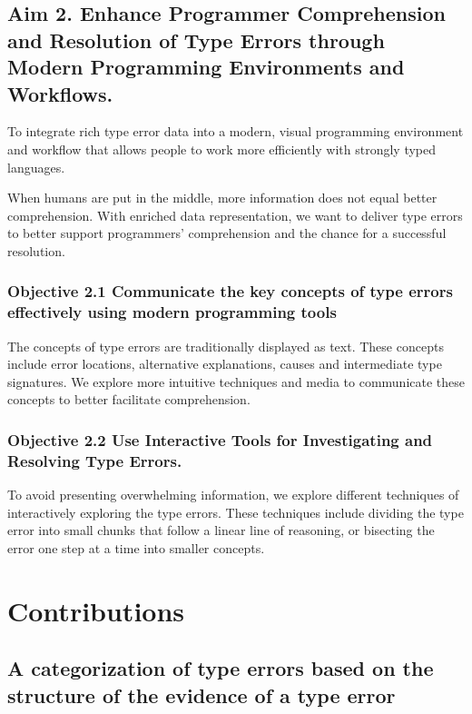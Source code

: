 \subsection{Aim 2.  Enhance Programmer Comprehension and Resolution of Type Errors through Modern Programming Environments and Workflows.}

To integrate rich type error data into a modern, visual programming environment and workflow that allows people to work more efficiently with strongly typed languages.


When humans are put in the middle, more information does not equal better comprehension. With enriched data representation, we want to deliver type errors to better support programmers’ comprehension and the chance for a successful resolution.

\subsubsection{Objective 2.1 Communicate the key concepts of type errors effectively using modern programming tools}

The concepts of type errors are traditionally displayed as text. These concepts include error locations, alternative explanations, causes and intermediate type signatures. We explore more intuitive techniques and media to communicate these concepts to better facilitate comprehension.

\subsubsection{Objective 2.2 Use Interactive Tools for Investigating and Resolving Type Errors.}

To avoid presenting overwhelming information, we explore different techniques of interactively exploring the type errors. These techniques include dividing the type error into small chunks that follow a linear line of reasoning, or bisecting the error one step at a time into smaller concepts.


\section{Contributions}


\subsection{A categorization of type errors based on the structure of the evidence of a type error}

